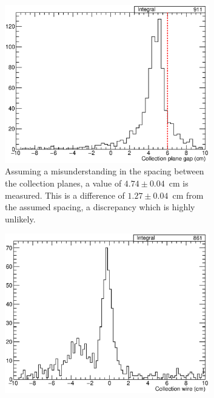 \begin{figure}
  \centering
  \begin{subfigure}[t]{0.48\linewidth}
    \centering
    \includegraphics[width=0.98\textwidth]{ExtraCorrectionPlaneSpacing.eps}
    \caption{Assuming a misunderstanding in the spacing between the collection planes, a value of $4.74\pm0.04$~cm is measured.  This is a difference of $1.27\pm0.04$~cm from the assumed spacing, a discrepancy which is highly unlikely.}
    \label{fig:ExtraCorrectionPlaneSpacing}
  \end{subfigure}
  \hfill
  \begin{subfigure}[t]{0.48\linewidth}
    \centering
    \includegraphics[width=0.98\textwidth]{ExtraCorrectionWire.eps}

\end{subfigure}
\end{figure}
